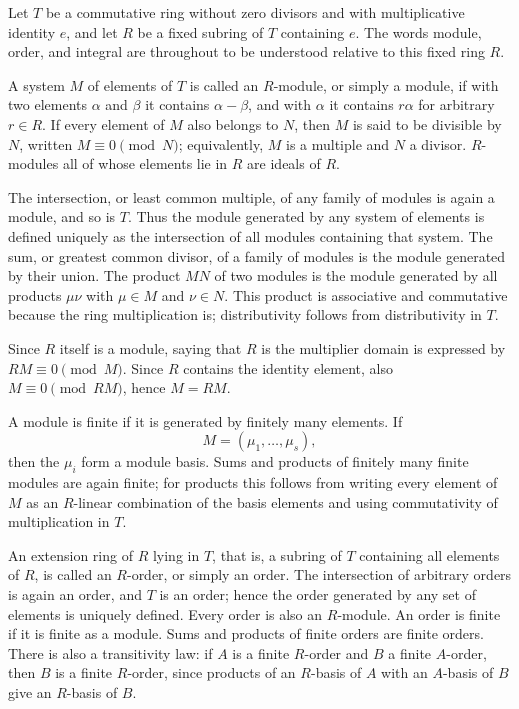 \documentclass[11pt]{article}
\begin{document}
Let $T$ be a commutative ring without zero divisors and with multiplicative identity $e$, and let $R$ be a fixed subring of $T$ containing $e$. The words module, order, and integral are throughout to be understood relative to this fixed ring $R$.

A system $M$ of elements of $T$ is called an $R$-module, or simply a module, if with two elements $\alpha$ and $\beta$ it contains $\alpha-\beta$, and with $\alpha$ it contains $r\alpha$ for arbitrary $r\in R$. If every element of $M$ also belongs to $N$, then $M$ is said to be divisible by $N$, written $M\equiv0\pmod N$; equivalently, $M$ is a multiple and $N$ a divisor. $R$-modules all of whose elements lie in $R$ are ideals of $R$.

The intersection, or least common multiple, of any family of modules is again a module, and so is $T$. Thus the module generated by any system of elements is defined uniquely as the intersection of all modules containing that system. The sum, or greatest common divisor, of a family of modules is the module generated by their union. The product $MN$ of two modules is the module generated by all products $\mu\nu$ with $\mu\in M$ and $\nu\in N$. This product is associative and commutative because the ring multiplication is; distributivity follows from distributivity in $T$.

Since $R$ itself is a module, saying that $R$ is the multiplier domain is expressed by $RM\equiv0\pmod M$. Since $R$ contains the identity element, also $M\equiv0\pmod{RM}$, hence $M=RM$.

A module is finite if it is generated by finitely many elements. If
\[
  M=(\mu_1,\ldots,\mu_s),
\]
then the $\mu_i$ form a module basis. Sums and products of finitely many finite modules are again finite; for products this follows from writing every element of $M$ as an $R$-linear combination of the basis elements and using commutativity of multiplication in $T$.

An extension ring of $R$ lying in $T$, that is, a subring of $T$ containing all elements of $R$, is called an $R$-order, or simply an order. The intersection of arbitrary orders is again an order, and $T$ is an order; hence the order generated by any set of elements is uniquely defined. Every order is also an $R$-module. An order is finite if it is finite as a module. Sums and products of finite orders are finite orders. There is also a transitivity law: if $A$ is a finite $R$-order and $B$ a finite $A$-order, then $B$ is a finite $R$-order, since products of an $R$-basis of $A$ with an $A$-basis of $B$ give an $R$-basis of $B$.
\end{document}
